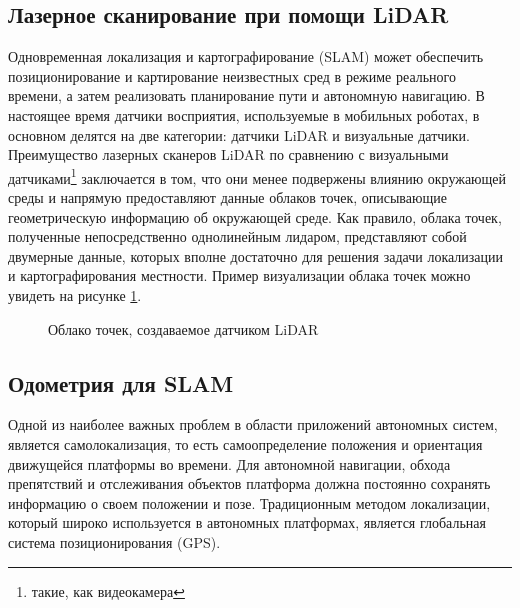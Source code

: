 \documentclass[12pt,a4paper]{scrartcl}
\begin{document}
			\subsection{Лазерное сканирование при помощи LiDAR}
				Одновременная локализация и картографирование (SLAM) может обеспечить позиционирование и картирование неизвестных сред в режиме реального времени, а затем реализовать планирование пути и автономную навигацию. В настоящее время датчики восприятия, используемые в мобильных роботах, в основном делятся на две категории: датчики LiDAR и визуальные датчики. Преимущество лазерных сканеров LiDAR по сравнению с визуальными датчиками\footnote{такие, как видеокамера} заключается в том, что они менее подвержены влиянию окружающей среды и напрямую предоставляют данные облаков точек, описывающие геометрическую информацию об окружающей среде. Как правило, облака точек, полученные непосредственно однолинейным лидаром, представляют собой двумерные данные, которых вполне достаточно для решения задачи локализации и картографирования местности\cite{bib:TrajOptimizeLidarSLAM}. Пример визуализации облака точек можно увидеть на рисунке \ref{fig:LiDARExample}.
				
				\begin{figure}[h]
					\caption{Облако точек, создаваемое датчиком LiDAR}
					\label{fig:LiDARExample}
				\end{figure}				
				
			\subsection{Одометрия для SLAM}
				Одной из наиболее важных проблем в области приложений автономных систем, является самолокализация, то есть самоопределение положения и ориентация движущейся платформы во времени. Для автономной навигации, обхода препятствий и отслеживания объектов платформа должна постоянно сохранять информацию о своем положении и позе. Традиционным методом локализации, который широко используется в автономных платформах, является глобальная система позиционирования (GPS). 
				
\end{document}
